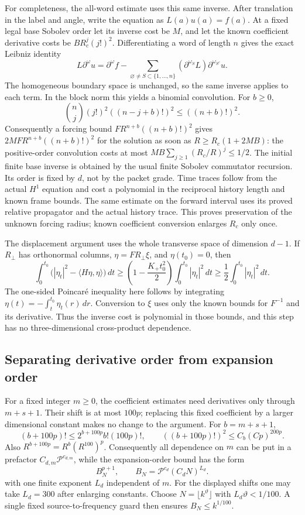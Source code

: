 For completeness, the all-word estimate uses this same inverse. After
translation in the label and angle, write the equation as
$L(a)u(a)=f(a)$. At a fixed legal base Sobolev order let its inverse cost
be $M$, and let the known coefficient derivative costs be
$B R_c^j(j!)^2$. Differentiating a word of length $n$ gives the exact
Leibniz identity
\[
 L\partial^\omega u=\partial^\omega f-
 \sum_{\varnothing\ne S\subset\{1,\ldots,n\}}
 (\partial^{\omega_S}L)\partial^{\omega_{S^c}}u.
\]
The homogeneous boundary space is unchanged, so the same inverse applies
to each term. In the block norm this yields a binomial convolution.
For $b\ge0$,
\[
 \binom nj(j!)^2((n-j+b)!)^2\le((n+b)!)^2.
\]
Consequently a forcing bound $F R^{n+b}((n+b)!)^2$ gives
$2MF R^{n+b}((n+b)!)^2$ for the solution as soon as
$R\ge R_c(1+2MB)$: the positive-order convolution costs at most
$MB\sum_{j\ge1}(R_c/R)^j\le1/2$.
The initial finite base inverse is obtained by the usual finite Sobolev
commutator recursion. Its order is fixed by $d$, not by the packet grade.
Time traces follow from the actual $H^1$ equation and cost a polynomial
in the reciprocal history length and known frame bounds. The same estimate
on the forward interval uses its proved relative propagator and the actual
history trace. This proves preservation of the unknown forcing radius;
known coefficient conversion enlarges $R_c$ only once.

The displacement argument uses the whole transverse space of dimension
$d-1$. If $R_\perp$ has orthonormal columns, $\eta=FR_\perp\xi$, and
$\eta(t_0)=0$, then
\[
 \int_0^{t_0}\bigl(|\eta_t|^2-\langle H\eta,\eta\rangle\bigr)\,dt
 \ge \left(1-\frac{K_+t_0^2}{2}\right)
                       \int_0^{t_0}|\eta_t|^2\,dt
 \ge\frac12\int_0^{t_0}|\eta_t|^2\,dt.
\]
The one-sided Poincar\'e inequality here follows by integrating
$\eta(t)=-\int_t^{t_0}\eta_t(r)\,dr$. Conversion to $\xi$ uses only the
known bounds for $F^{-1}$ and its derivative. Thus the inverse cost is
polynomial in those bounds, and this step has no three-dimensional
cross-product dependence.

\subsection{Separating derivative order from expansion order}
For a fixed integer $m\ge0$, the coefficient estimates need derivatives
only through $m+s+1$. Their shift is at most $100p$; replacing this fixed
coefficient by a larger dimensional constant makes no change to the
argument. For $b=m+s+1$,
\[
 (b+100p)!\le2^{b+100p}b!(100p)!,\qquad
 ((b+100p)!)^2\le C_b(Cp)^{200p}.
\]
Also $R^{b+100p}=R^b(R^{100})^p$. Consequently all dependence on $m$
can be put in a prefactor $C_{d,m}\mathcal P^{c_{d,m}}$, while the
expansion-order bound has the form
\begin{equation}
 B_N^{p+1},\qquad B_N=\mathcal P^{c_d}(C_dN)^{L_d}.
 \label{eq:initial-grade-base}
\end{equation}
with one finite exponent $L_d$ independent of $m$.
For the displayed shifts one may take $L_d=300$ after enlarging constants.
Choose $N=\lfloor k^\vartheta\rfloor$ with
$L_d\vartheta<1/100$. A single fixed source-to-frequency guard then
ensures $B_N\le k^{1/100}$.

